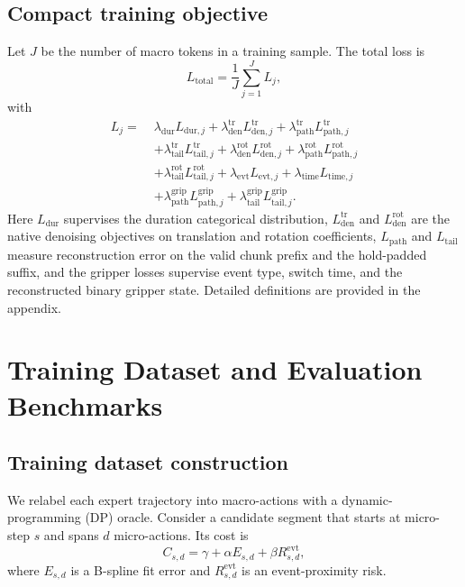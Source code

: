 \documentclass[10pt,twocolumn,letterpaper]{article}
\begin{document}
\subsection{Compact training objective}
Let $J$ be the number of macro tokens in a training sample. The total loss is
\begin{equation}
L_{\text{total}} = \frac{1}{J}\sum_{j=1}^{J} L_j,
\end{equation}
with
\begin{align}
L_j =\;& \lambda_{\mathrm{dur}}L_{\mathrm{dur},j}
+ \lambda_{\mathrm{den}}^{\mathrm{tr}}L_{\mathrm{den},j}^{\mathrm{tr}}
+ \lambda_{\mathrm{path}}^{\mathrm{tr}}L_{\mathrm{path},j}^{\mathrm{tr}} \nonumber\\
&+ \lambda_{\mathrm{tail}}^{\mathrm{tr}}L_{\mathrm{tail},j}^{\mathrm{tr}}
+ \lambda_{\mathrm{den}}^{\mathrm{rot}}L_{\mathrm{den},j}^{\mathrm{rot}}
+ \lambda_{\mathrm{path}}^{\mathrm{rot}}L_{\mathrm{path},j}^{\mathrm{rot}} \nonumber\\
&+ \lambda_{\mathrm{tail}}^{\mathrm{rot}}L_{\mathrm{tail},j}^{\mathrm{rot}}
+ \lambda_{\mathrm{evt}}L_{\mathrm{evt},j}
+ \lambda_{\mathrm{time}}L_{\mathrm{time},j} \nonumber\\
&+ \lambda_{\mathrm{path}}^{\mathrm{grip}}L_{\mathrm{path},j}^{\mathrm{grip}}
+ \lambda_{\mathrm{tail}}^{\mathrm{grip}}L_{\mathrm{tail},j}^{\mathrm{grip}}.
\label{eq:total-loss-main}
\end{align}
Here $L_{\mathrm{dur}}$ supervises the duration categorical distribution, $L_{\mathrm{den}}^{\mathrm{tr}}$ and $L_{\mathrm{den}}^{\mathrm{rot}}$ are the native denoising objectives on translation and rotation coefficients, $L_{\mathrm{path}}$ and $L_{\mathrm{tail}}$ measure reconstruction error on the valid chunk prefix and the hold-padded suffix, and the gripper losses supervise event type, switch time, and the reconstructed binary gripper state. Detailed definitions are provided in the appendix.

\section{Training Dataset and Evaluation Benchmarks}
\subsection{Training dataset construction}
We relabel each expert trajectory into macro-actions with a dynamic-programming (DP) oracle. Consider a candidate segment that starts at micro-step $s$ and spans $d$ micro-actions. Its cost is
\begin{equation}
C_{s,d} = \gamma + \alpha E_{s,d} + \beta R^{\mathrm{evt}}_{s,d},
\label{eq:segment-cost}
\end{equation}
where $E_{s,d}$ is a B-spline fit error and $R^{\mathrm{evt}}_{s,d}$ is an event-proximity risk.
\end{document}
